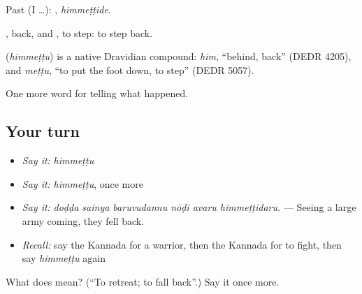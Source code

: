 Past (I …): , \emph{himmeṭṭide}.

, back, and , to step: to step back.

\begin{cousinweb}
\textbf{} (\emph{himmeṭṭu}) is a native Dravidian compound: \emph{him}, \textquotedblleft{}behind, back\textquotedblright{} (DEDR 4205), and \emph{meṭṭu}, \textquotedblleft{}to put the foot down, to step\textquotedblright{} (DEDR 5057).
\end{cousinweb}

\begin{grammarlens}[title={What you've built}]
One more word for telling what happened.
\end{grammarlens}

\subsection*{Your turn}
\begin{itemize}
\raggedright
  \item \emph{Say it:} \emph{himmeṭṭu}
  \item \emph{Say it:} \emph{himmeṭṭu}, once more
  \item \emph{Say it:} \emph{doḍḍa sainya baruvudannu nōḍi avaru himmeṭṭidaru.} — Seeing a large army coming, they fell back.
  \item \emph{Recall:} say the Kannada for a warrior, then the Kannada for to fight, then say \emph{himmeṭṭu} again
\end{itemize}

\begin{tcolorbox}[breakable,colback=teal!4,colframe=teal!35!black,title={Before you move on}]
What does  mean? (\textquotedblleft{}To retreat; to fall back\textquotedblright{}.) Say it once more.
\end{tcolorbox}
